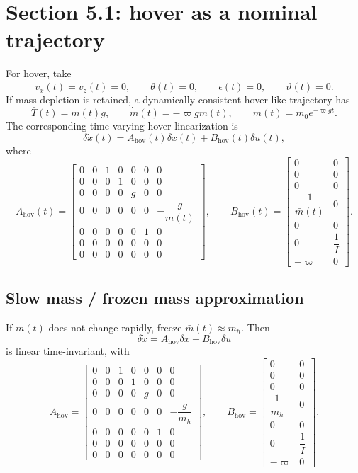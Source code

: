 \documentclass[10pt]{article}
\newcommand{\dd}{\delta}
\newcommand{\thb}{\bar\theta}
\newcommand{\mb}{\bar m}
\newcommand{\Tb}{\bar T}
\newcommand{\eps}{\epsilon}
\newcommand{\vphi}{\varpi}
\begin{document}
\section{Section 5.1: hover as a nominal trajectory}
For hover, take
\[
    \bar v_x(t)=\bar v_z(t)=0,
    \qquad
    \thb(t)=0,
    \qquad
    \bar\eps(t)=0,
    \qquad
    \bar\vartheta(t)=0.
\]
If mass depletion is retained, a dynamically consistent hover-like trajectory has
\[
    \Tb(t)=\mb(t)g,
    \qquad
    \dot{\mb}(t)=-\vphi g\mb(t),
    \qquad
    \mb(t)=m_0e^{-\vphi gt}.
\]
The corresponding time-varying hover linearization is
\[
    \dd\dot x(t)=A_{\mathrm{hov}}(t)\dd x(t)+B_{\mathrm{hov}}(t)\dd u(t),
\]
where
{\small
\[
A_{\mathrm{hov}}(t)=
\begin{bmatrix}
0&0&1&0&0&0&0\\
0&0&0&1&0&0&0\\
0&0&0&0&g&0&0\\
0&0&0&0&0&0&-\dfrac{g}{\mb(t)}\\
0&0&0&0&0&1&0\\
0&0&0&0&0&0&0\\
0&0&0&0&0&0&0
\end{bmatrix},
\qquad
B_{\mathrm{hov}}(t)=
\begin{bmatrix}
0&0\\
0&0\\
0&0\\
\dfrac{1}{\mb(t)}&0\\
0&0\\
0&\dfrac{1}{I}\\
-\vphi&0
\end{bmatrix}.
\]
}

\subsection*{Slow mass / frozen mass approximation}
If $m(t)$ does not change rapidly, freeze $\mb(t)\approx m_h$. Then
\[
    \boxed{\dd\dot x=A_{\mathrm{hov}}\dd x+B_{\mathrm{hov}}\dd u}
\]
is linear time-invariant, with
{\small
\[
A_{\mathrm{hov}}=
\begin{bmatrix}
0&0&1&0&0&0&0\\
0&0&0&1&0&0&0\\
0&0&0&0&g&0&0\\
0&0&0&0&0&0&-\dfrac{g}{m_h}\\
0&0&0&0&0&1&0\\
0&0&0&0&0&0&0\\
0&0&0&0&0&0&0
\end{bmatrix},
\qquad
B_{\mathrm{hov}}=
\begin{bmatrix}
0&0\\
0&0\\
0&0\\
\dfrac{1}{m_h}&0\\
0&0\\
0&\dfrac{1}{I}\\
-\vphi&0
\end{bmatrix}.
\]
}
\end{document}
